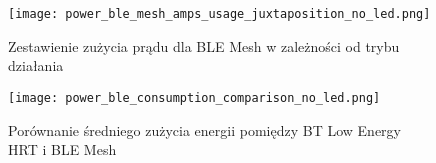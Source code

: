 \lipsum[1-3]
	\begin{figure}[!htb]
	\centering \texttt{[image: power\_ble\_mesh\_amps\_usage\_juxtaposition\_no\_led.png]} 
	\caption{Zestawienie zużycia prądu dla BLE Mesh w zależności od trybu działania}
	\label{rys:power_ble_mesh_amps_usage_juxtaposition}
\end{figure}

\lipsum[1-3]
\begin{figure}[!htb]
	\centering \texttt{[image: power\_ble\_consumption\_comparison\_no\_led.png]} 
	\caption{Porównanie średniego zużycia energii pomiędzy BT Low Energy HRT i BLE Mesh}
	\label{rys:power_ble_consumption_comparison}
\end{figure}


